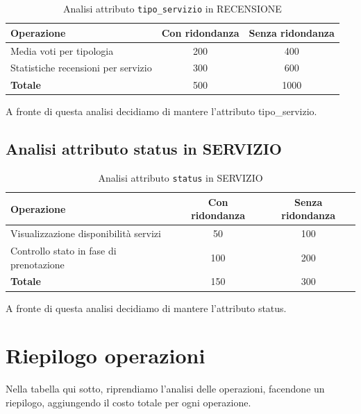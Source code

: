 \documentclass[a4paper,12pt]{report}
\begin{document}
\begin{table}[H]
	\centering
	\begin{tabular}{|l|c|c|}
		\hline
		\textbf{Operazione}                 & \textbf{Con ridondanza} & \textbf{Senza ridondanza} \\
		\hline
		Media voti per tipologia            & 200                     & 400                       \\
		Statistiche recensioni per servizio & 300                     & 600                       \\
		\hline
		\textbf{Totale}                     & 500                     & 1000                      \\
		\hline
	\end{tabular}
	\caption{Analisi attributo \texttt{tipo\_servizio} in RECENSIONE}
\end{table}

A fronte di questa analisi decidiamo di mantere l'attributo tipo\_servizio.

\subsection{Analisi attributo status in SERVIZIO}

\begin{table}[H]
	\centering
	\begin{tabular}{|l|c|c|}
		\hline
		\textbf{Operazione}                     & \textbf{Con ridondanza} & \textbf{Senza ridondanza} \\
		\hline
		Visualizzazione disponibilità servizi   & 50                      & 100                       \\
		Controllo stato in fase di prenotazione & 100                     & 200                       \\
		\hline
		\textbf{Totale}                         & 150                     & 300                       \\
		\hline
	\end{tabular}
	\caption{Analisi attributo \texttt{status} in SERVIZIO}
\end{table}

A fronte di questa analisi decidiamo di mantere l'attributo status.

\section{Riepilogo operazioni}
Nella tabella qui sotto, riprendiamo l'analisi delle operazioni, facendone un riepilogo, aggiungendo
il costo totale per ogni operazione.
\end{document}
